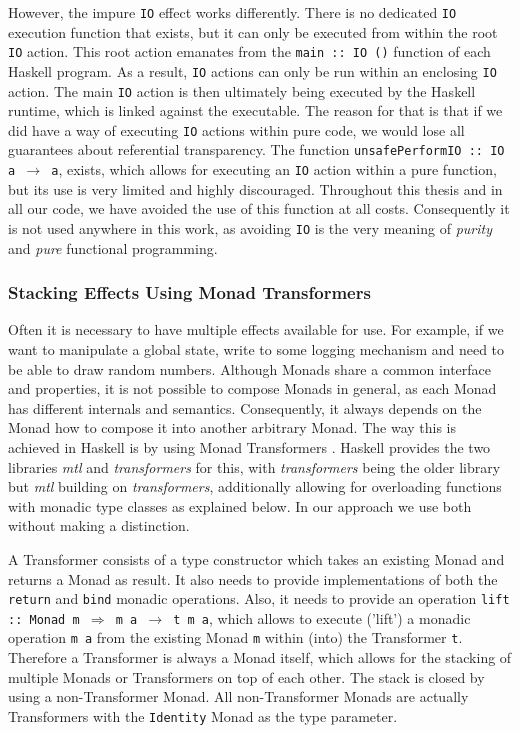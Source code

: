 However, the impure \texttt{IO} effect works differently. There is no dedicated \texttt{IO} execution function that exists, but it can only be executed from within the root \texttt{IO} action. This root action emanates from the \texttt{main :: IO ()} function of each Haskell program. As a result, \texttt{IO} actions can only be run within an enclosing \texttt{IO} action. The main \texttt{IO} action is then ultimately being executed by the Haskell runtime, which is linked against the executable. The reason for that is that if we did have a way of executing \texttt{IO} actions within pure code, we would lose all guarantees about referential transparency. The function \texttt{unsafePerformIO :: IO a $\rightarrow$ a}, exists, which allows for executing an \texttt{IO} action within a pure function, but its use is very limited and highly discouraged. Throughout this thesis and in all our code, we have avoided the use of this function at all costs. Consequently it is not used anywhere in this work, as avoiding \texttt{IO} is the very meaning of \textit{purity} and \textit{pure} functional programming.

\subsubsection{Stacking Effects Using Monad Transformers}
\label{sec:back_transformers}
Often it is necessary to have multiple effects available for use. For example, if we want to manipulate a global state, write to some logging mechanism and need to be able to draw random numbers. Although Monads share a common interface and properties, it is not possible to compose Monads in general, as each Monad has different internals and semantics. Consequently, it always depends on the Monad how to compose it into another arbitrary Monad. The way this is achieved in Haskell is by using Monad Transformers \cite{allen_haskell_2016, jones_functional_1995, jones_tackling_2002}. Haskell provides the two libraries \textit{mtl} and \textit{transformers} for this, with \textit{transformers} being the older library but \textit{mtl} building on \textit{transformers}, additionally allowing for overloading functions with monadic type classes as explained below. In our approach we use both without making a distinction.

A Transformer consists of a type constructor which takes an existing Monad and returns a Monad as result. It also needs to provide implementations of both the \texttt{return} and \texttt{bind} monadic operations. Also, it needs to provide an operation \texttt{lift :: Monad m $\Rightarrow$ m a $\rightarrow$ t m a}, which allows to execute ('lift') a monadic operation \texttt{m a} from the existing Monad \texttt{m} within (into) the Transformer \texttt{t}. Therefore a Transformer is always a Monad itself, which allows for the stacking of multiple Monads or Transformers on top of each other. The stack is closed by using a non-Transformer Monad. All non-Transformer Monads are actually Transformers with the \texttt{Identity} Monad as the type parameter.

